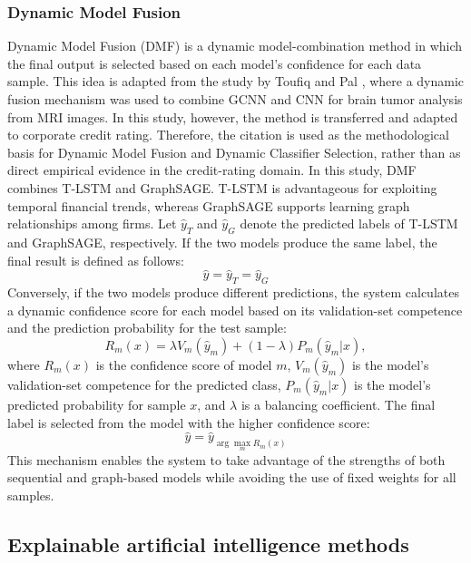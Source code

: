 \documentclass[10pt,twoside]{article}
\begin{document}
\subsubsection{Dynamic Model Fusion}
Dynamic Model Fusion (DMF) is a dynamic model-combination method in which the final output is selected based on each model's confidence for each data sample. This idea is adapted from the study by Toufiq and Pal \cite{toufiq_explainable_2026}, where a dynamic fusion mechanism was used to combine GCNN and CNN for brain tumor analysis from MRI images. In this study, however, the method is transferred and adapted to corporate credit rating. Therefore, the citation \cite{toufiq_explainable_2026} is used as the methodological basis for Dynamic Model Fusion and Dynamic Classifier Selection, rather than as direct empirical evidence in the credit-rating domain. In this study, DMF combines T-LSTM and GraphSAGE. T-LSTM is advantageous for exploiting temporal financial trends, whereas GraphSAGE supports learning graph relationships among firms. Let $\hat{y}_{T}$ and $\hat{y}_{G}$ denote the predicted labels of T-LSTM and GraphSAGE, respectively. If the two models produce the same label, the final result is defined as follows:
\begin{equation} \hat{y} = \hat{y}_{T} = \hat{y}_{G} \end{equation}
Conversely, if the two models produce different predictions, the system calculates a dynamic confidence score for each model based on its validation-set competence and the prediction probability for the test sample:
\begin{equation} R_m(x) = \lambda V_m(\hat{y}_m) + (1-\lambda) P_m(\hat{y}_m|x), \end{equation}
where $R_m(x)$ is the confidence score of model $m$, $V_m(\hat{y}_m)$ is the model's validation-set competence for the predicted class, $P_m(\hat{y}_m|x)$ is the model's predicted probability for sample $x$, and $\lambda$ is a balancing coefficient. The final label is selected from the model with the higher confidence score:
\begin{equation} \hat{y} = \hat{y}_{\arg\max_m R_m(x)} \end{equation}
This mechanism enables the system to take advantage of the strengths of both sequential and graph-based models while avoiding the use of fixed weights for all samples.

\subsection{Explainable artificial intelligence methods}
\end{document}
